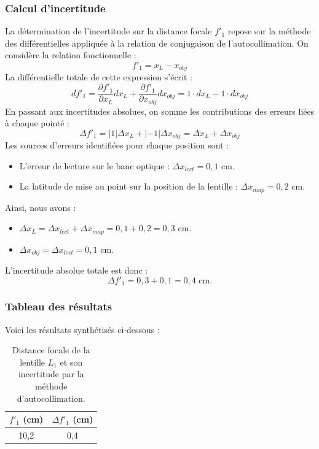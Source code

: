 \subsubsection{Calcul d'incertitude}
La détermination de l'incertitude sur la distance focale $f'_{1}$ repose sur la méthode des différentielles appliquée à la relation de conjugaison de l'autocollimation. 
On considère la relation fonctionnelle : 
\[ f'_{1} = x_{L} - x_{obj} \] 
La différentielle totale de cette expression s'écrit : 
\[ df'_{1} = \frac{\partial f'_{1}}{\partial x_{L}}dx_{L} + \frac{\partial f'_{1}}{\partial x_{obj}}dx_{obj} = 1 \cdot dx_{L} - 1 \cdot dx_{obj} \] 
En passant aux incertitudes absolues, on somme les contributions des erreurs liées à chaque pointé : 
\[ \Delta f'_{1} = |1| \Delta x_{L} + |-1| \Delta x_{obj} = \Delta x_{L} + \Delta x_{obj} \] 
Les sources d'erreurs identifiées pour chaque position sont : 
\begin{itemize}
    \item L'erreur de lecture sur le banc optique : $\Delta x_{lect} = 0,1$ cm.
    \item La latitude de mise au point sur la position de la lentille : $\Delta x_{map} = 0,2$ cm. 
\end{itemize}
Ainsi, nous avons : 
\begin{itemize}
    \item $\Delta x_{L} = \Delta x_{lect} + \Delta x_{map} = 0,1 + 0,2 = 0,3$ cm. 
    \item $\Delta x_{obj} = \Delta x_{lect} = 0,1$ cm. 
\end{itemize}
L'incertitude absolue totale est donc : 
\[ \Delta f'_{1} = 0,3 + 0,1 = 0,4 \text{ cm.} \]

\subsubsection{Tableau des résultats}
Voici les résultats synthétisés ci-dessous : 

\begin{table}[h]
    \centering
    \begin{tabular}{|c|c|}
        \hline
        $f'_{1}$ (cm) & $\Delta f'_{1}$ (cm) \\
        \hline
        10,2 & 0,4 \\
        \hline
    \end{tabular}
    \caption{Distance focale de la lentille $L_1$ et son incertitude par la méthode d'autocollimation.}
\end{table}

